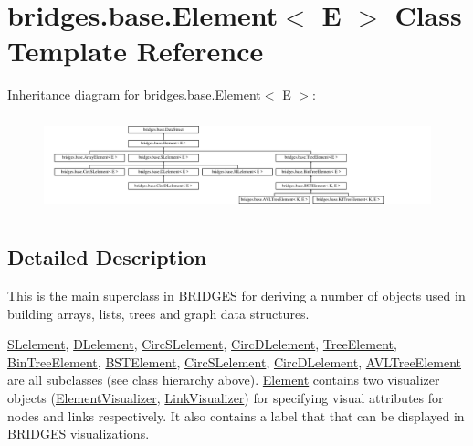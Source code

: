 \hypertarget{classbridges_1_1base_1_1_element}{}\section{bridges.\+base.\+Element$<$ E $>$ Class Template Reference}
\label{classbridges_1_1base_1_1_element}
Inheritance diagram for bridges.\+base.\+Element$<$ E $>$\+:\begin{figure}[H]
\begin{center}
\leavevmode
\includegraphics[height=2.788382cm]{classbridges_1_1base_1_1_element}
\end{center}
\end{figure}


\subsection{Detailed Description}
This is the main superclass in B\+R\+I\+D\+G\+ES for deriving a number of objects used in building arrays, lists, trees and graph data structures. 

\mbox{\hyperlink{classbridges_1_1base_1_1_s_lelement}{S\+Lelement}}, \mbox{\hyperlink{classbridges_1_1base_1_1_d_lelement}{D\+Lelement}}, \mbox{\hyperlink{classbridges_1_1base_1_1_circ_s_lelement}{Circ\+S\+Lelement}}, \mbox{\hyperlink{classbridges_1_1base_1_1_circ_d_lelement}{Circ\+D\+Lelement}}, \mbox{\hyperlink{classbridges_1_1base_1_1_tree_element}{Tree\+Element}}, \mbox{\hyperlink{classbridges_1_1base_1_1_bin_tree_element}{Bin\+Tree\+Element}}, \mbox{\hyperlink{classbridges_1_1base_1_1_b_s_t_element}{B\+S\+T\+Element}}, \mbox{\hyperlink{classbridges_1_1base_1_1_circ_s_lelement}{Circ\+S\+Lelement}}, \mbox{\hyperlink{classbridges_1_1base_1_1_circ_d_lelement}{Circ\+D\+Lelement}}, \mbox{\hyperlink{classbridges_1_1base_1_1_a_v_l_tree_element}{A\+V\+L\+Tree\+Element}} are all subclasses (see class hierarchy above). \mbox{\hyperlink{classbridges_1_1base_1_1_element}{Element}} contains two visualizer objects (\mbox{\hyperlink{classbridges_1_1base_1_1_element_visualizer}{Element\+Visualizer}}, \mbox{\hyperlink{classbridges_1_1base_1_1_link_visualizer}{Link\+Visualizer}}) for specifying visual attributes for nodes and links respectively. It also contains a label that that can be displayed in B\+R\+I\+D\+G\+ES visualizations.

